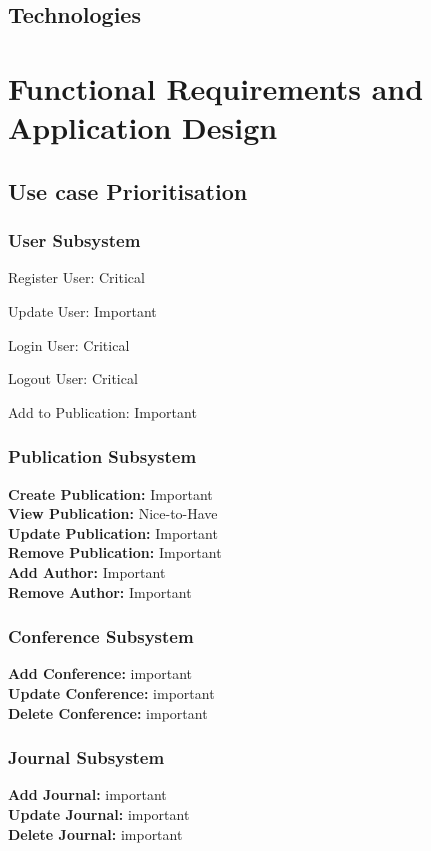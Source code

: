 \documentclass{article}
\begin{document}
		\subsection{Technologies}
		
	
	\section{Functional Requirements and Application Design}
		\subsection{Use case Prioritisation}
			\subsubsection{User Subsystem}
				Register User: Critical\par
				Update User: Important\par
				Login User: Critical\par
				Logout User: Critical\par
				Add to Publication: Important
			\subsubsection{Publication Subsystem}
			\textbf{Create Publication:} Important\\
			\textbf{View Publication:} Nice-to-Have\\
			\textbf{Update Publication:} Important\\
			\textbf{Remove Publication:} Important\\
			\textbf{Add Author:} Important\\
			\textbf{Remove Author:} Important\\
			\subsubsection{Conference Subsystem}
				\textbf{Add Conference:} important\\
				\textbf{Update Conference:} important\\
				\textbf{Delete Conference:} important
			\subsubsection{Journal Subsystem}
				\textbf{Add Journal:} important\\
				\textbf{Update Journal:} important\\
				\textbf{Delete Journal:} important
\end{document}
